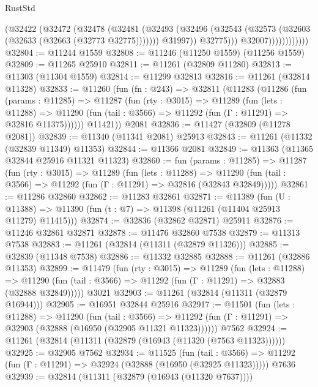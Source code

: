 \begin{lexlean}{RustStd}
\begin{coremodule}
                            (@32422
                              (@32472
                                (@32478
                                  (@32481
                                    (@32493
                                      (@32496
                                        (@32543
                                          (@32573 (@32603 (@32633 (@32663 (@32773 @32775)))))))
                                      @31997))
                                  @32775)))
                            @32007))))))))))))
@32804 := @11244 @1559
@32808 := @11246 (@11250 @1559) (@11256 @1559)
@32809 := @11265 @25910
@32811 := @11261 (@32809 @11280)
@32813 := @11303 (@11304 @1559)
@32814 := @11299 @32813
@32816 := @11261 (@32814 @11328)
@32833 := @11260
    (fun (fn : @243) =>
    @32811
      (@11283
        (@11286
          (fun (params : @11285) =>
          @11287
            (fun (rty : @3015) =>
            @11289
              (fun (lets : @11288) =>
              @11290 (fun (tail : @3566) => @11292 (fun (Γ : @11291) => @32816 @11375))))))
        @11421))
    @2081
@32836 := @11427 (@32809 (@11278 @2081))
@32839 := @11340 (@11341 @2081) @25913
@32843 := @11261 (@11332 (@32839 @11349) @11353)
@32844 := @11366 @2081
@32849 := @11363 (@11365 @32844 @25916 @11321 @11323)
@32860 := fun (params : @11285) =>
  @11287
    (fun (rty : @3015) =>
    @11289
      (fun (lets : @11288) =>
      @11290 (fun (tail : @3566) => @11292 (fun (Γ : @11291) => @32816 (@32843 @32849)))))
@32861 := @11286 @32860
@32862 := @11283 @32861
@32871 := @11389
    (fun (U : @11388) => @11390 (fun (t : @7) => @11398 (@11261 (@11404 @25913 @11279) @11415)))
@32874 := @32836 (@32862 @32871) @25911
@32876 := @11246 @32861 @32871
@32878 := @11476 @32860 @7538
@32879 := @11313 @7538
@32883 := @11261 (@32814 (@11311 (@32879 @11326)))
@32885 := @32839 (@11348 @7538)
@32886 := @11332 @32885
@32888 := @11261 (@32886 @11353)
@32899 := @11479
    (fun (rty : @3015) =>
    @11289
      (fun (lets : @11288) =>
      @11290 (fun (tail : @3566) => @11292 (fun (Γ : @11291) => @32883 (@32888 @32849)))))
    @3021
@32903 := @11261 (@32814 (@11311 (@32879 @16944)))
@32905 := @16951 @32844 @25916
@32917 := @11501
    (fun (lets : @11288) =>
    @11290
      (fun (tail : @3566) =>
      @11292 (fun (Γ : @11291) => @32903 (@32888 (@16950 (@32905 @11321 @11323))))))
    @7562
@32924 := @11261 (@32814 (@11311 (@32879 (@16943 (@11320 (@7563 @11323))))))
@32925 := @32905 @7562
@32934 := @11525
    (fun (tail : @3566) => @11292 (fun (Γ : @11291) => @32924 (@32888 (@16950 (@32925 @11323)))))
    @7636
@32939 := @32814 (@11311 (@32879 (@16943 (@11320 @7637))))

\end{coremodule}
\end{lexlean}

